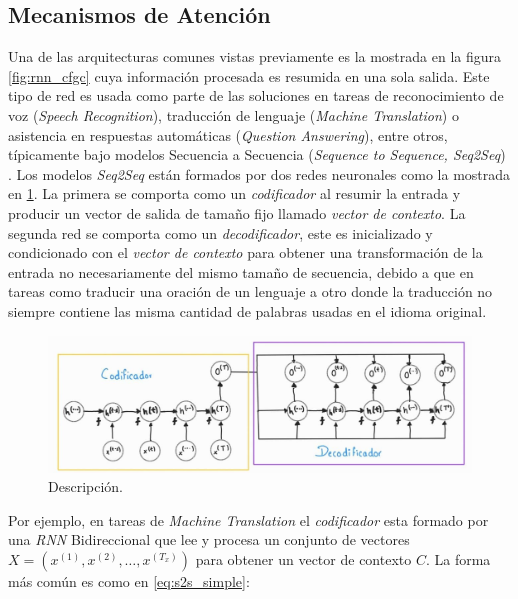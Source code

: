 \subsection{Mecanismos de Atención} \label{section:att}

Una de las arquitecturas comunes vistas previamente es la mostrada en la figura \ref{fig:rnn_cfgc} cuya información
procesada es resumida en una sola salida. Este tipo de red es usada como parte de las soluciones en
tareas de reconocimiento de voz (\textit{Speech Recognition}), traducción de lenguaje
(\textit{Machine Translation}) o asistencia en respuestas automáticas (\textit{Question Answering}), entre
otros,
típicamente bajo modelos Secuencia a Secuencia (\textit{Sequence to Sequence, Seq2Seq})
\cite{DBLP:journals/corr/ChoMGBSB14}. Los modelos
\textit{Seq2Seq} están formados por dos redes neuronales como la mostrada en \ref{fig:seq2seq}. La
primera se comporta como un \textit{codificador} al resumir la entrada y producir un vector de salida
de tamaño fijo llamado \textit{vector de contexto}. La segunda red se comporta como un
\textit{decodificador}, este es inicializado y condicionado con el
\textit{vector de contexto} para obtener una transformación de la entrada no necesariamente del
mismo tamaño de secuencia, debido a que en tareas como traducir una oración de un lenguaje a otro
donde la traducción no siempre contiene las misma cantidad de palabras usadas en el idioma original.

\begin{figure}[ht!]
    \centering
    \includegraphics[width=1.0 \textwidth]{Chapters/2. Transformer/Figures/rnn/seq2seq.jpg}
    \caption{Descripción.}
    \label{fig:seq2seq}
\end{figure}

Por ejemplo, en tareas de \textit{Machine Translation} el \textit{codificador} esta formado por una
\textit{RNN} Bidireccional que lee y procesa un conjunto de
vectores $X = (x^{(1)}, x^{(2)}, \dots, x^{(T_x)})$ para obtener un vector de contexto $C$. La forma
más común es como en \ref{eq:s2s_simple}:


